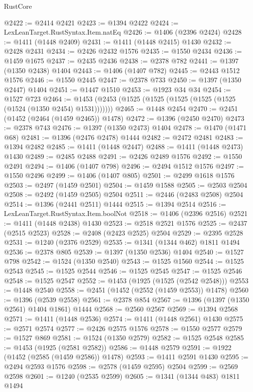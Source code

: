 \begin{lexlean}{RustCore}
\begin{coremodule}
@2422 := @2414 @2421
@2423 := @1394 @2422
@2424 := LexLeanTarget.RustSyntax.Item.natEq
@2426 := @1406 (@2396 @2424)
@2428 := @1411 (@1448 @2409)
@2431 := @1411 (@1448 @2415) @1430
@2432 := @2428 @2431
@2434 := @2426 @2432 @1576
@2435 := @1550 @2434
@2436 := @1459 @1675
@2437 := @2435 @2436
@2438 := @2378 @782
@2441 := @1397 (@1350 @2438) @1404
@2443 := @1406 (@1407 @782)
@2445 := @2443 @1512 @1576
@2446 := @1550 @2445
@2447 := @2378 @733
@2450 := @1397 (@1350 @2447) @1404
@2451 := @1447 @1510
@2453 := @1923 @34 @34
@2454 := @1527 @723
@2464 := @1453 (@2453 (@1525 (@1525 (@1525 (@1525 (@1525 (@1524 (@1350 @2454) @1531)))))))
@2465 := @1448 @2454
@2470 := @2451 (@1452 (@2464 (@1459 @2465)) @1478)
@2472 := @1396 (@2450 @2470)
@2473 := @2378 @743
@2476 := @1397 (@1350 @2473) @1404
@2478 := @1470 (@1471 @68)
@2481 := @1396 (@2476 @2478) @1444
@2482 := @2472 @2481
@2483 := @1394 @2482
@2485 := @1411 (@1448 @2447)
@2488 := @1411 (@1448 @2473) @1430
@2489 := @2485 @2488
@2491 := @2426 @2489 @1576
@2492 := @1550 @2491
@2494 := @1406 (@1407 @798)
@2496 := @2494 @1512 @1576
@2497 := @1550 @2496
@2499 := @1406 (@1407 @805)
@2501 := @2499 @1618 @1576
@2503 := @2497 (@1459 @2501)
@2504 := @1459 @1588
@2505 := @2503 @2504
@2508 := @2492 (@1459 @2505) @2504
@2511 := @2446 (@2483 @2508) @2504
@2514 := @1396 (@2441 @2511) @1444
@2515 := @1394 @2514
@2516 := LexLeanTarget.RustSyntax.Item.boolNot
@2518 := @1406 (@2396 @2516)
@2521 := @1411 (@1448 @2438) @1430
@2523 := @2518 @2521 @1576
@2525 := @2437 (@2515 @2523)
@2528 := @2408 (@2423 @2525) @2504
@2529 := @2395 @2528
@2531 := @1240 (@2376 @2529)
@2535 := @1341 (@1344 @462) @1811 @1494
@2536 := @2378 @805
@2539 := @1397 (@1350 @2536) @1404
@2540 := @1527 @798
@2542 := @1524 (@1350 @2540)
@2543 := @1525 @1560
@2544 := @1525 @2543
@2545 := @1525 @2544
@2546 := @1525 @2545
@2547 := @1525 @2546
@2548 := @1525 @2547
@2552 := @1453 (@1925 (@1525 (@2542 @2548)))
@2553 := @1448 @2540
@2558 := @2451 (@1452 (@2552 (@1459 @2553)) @1478)
@2560 := @1396 (@2539 @2558)
@2561 := @2378 @854
@2567 := @1396 (@1397 (@1350 @2561) @1404 @1861) @1444
@2568 := @2560 @2567
@2569 := @1394 @2568
@2571 := @1411 (@1448 @2536)
@2574 := @1411 (@1448 @2561) @1430
@2575 := @2571 @2574
@2577 := @2426 @2575 @1576
@2578 := @1550 @2577
@2579 := @1527 @869
@2581 := @1524 (@1350 @2579)
@2582 := @1525 @2548
@2585 := @1453 (@1925 (@2581 @2582))
@2586 := @1448 @2579
@2591 := @1922 (@1452 (@2585 (@1459 @2586)) @1478)
@2593 := @1411 @2591 @1430
@2595 := @2494 @2593 @1576
@2598 := @2578 (@1459 @2595) @2504
@2599 := @2569 @2598
@2601 := @1240 (@2535 @2599)
@2605 := @1341 (@1344 @483) @1811 @1494

\end{coremodule}
\end{lexlean}
